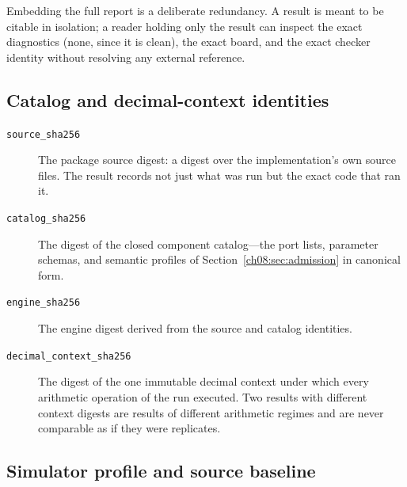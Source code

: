 Embedding the full report is a deliberate redundancy. A result is meant to be citable in isolation; a reader holding only the result can inspect the exact diagnostics (none, since it is clean), the exact board, and the exact checker identity without resolving any external reference.

\subsection{Catalog and decimal-context identities}

\begin{description}
\item[\texttt{source\_sha256}] The package source digest: a digest over the implementation's own source files. The result records not just what was run but the exact code that ran it.
\item[\texttt{catalog\_sha256}] The digest of the closed component catalog---the port lists, parameter schemas, and semantic profiles of Section~\ref{ch08:sec:admission} in canonical form.
\item[\texttt{engine\_sha256}] The engine digest derived from the source and catalog identities.
\item[\texttt{decimal\_context\_sha256}] The digest of the one immutable decimal context under which every arithmetic operation of the run executed. Two results with different context digests are results of different arithmetic regimes and are never comparable as if they were replicates.
\end{description}

\subsection{Simulator profile and source baseline}

